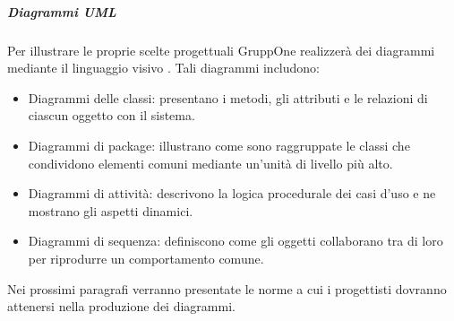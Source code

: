 \documentclass[../../norme-di-progetto.tex]{subfiles}
\begin{document}
\subparagraph{Diagrammi UML}%
\label{subp:diagrammi_UML}
Per illustrare le proprie scelte progettuali GruppOne realizzerà dei diagrammi mediante il linguaggio visivo .
Tali diagrammi includono:
\begin{itemize}
  \item Diagrammi delle classi: presentano i metodi, gli attributi e le relazioni di ciascun oggetto con il sistema.
  \item Diagrammi di package: illustrano come sono raggruppate le classi che condividono elementi comuni mediante un'unità di livello più alto.
  \item Diagrammi di attività: descrivono la logica procedurale dei casi d'uso e ne mostrano gli aspetti dinamici.
  \item Diagrammi di sequenza: definiscono come gli oggetti collaborano tra di loro per riprodurre un comportamento comune.
\end{itemize}
Nei prossimi paragrafi verranno presentate le norme a cui i progettisti dovranno attenersi nella produzione dei diagrammi.
\end{document}
